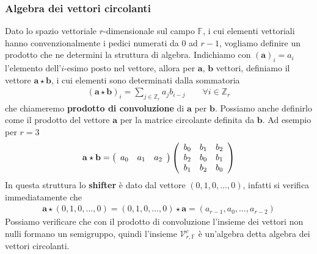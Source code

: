 
\subsubsection{Algebra dei vettori circolanti}

Dato lo spazio vettoriale $r$-dimensionale sul campo $\mathbb{F}$, i cui
elementi vettoriali hanno convenzionalmente i pedici numerati da $0$ ad $r-1$,
vogliamo definire un prodotto che ne determini la struttura di algebra. Indichiamo con $(\mathbf{a})_{i} = a_{i}$
l'elemento dell'$i$-esimo posto nel vettore, allora per $\mathbf{a}$, $\mathbf{b}$ vettori, definiamo il vettore $\mathbf{a} \star \mathbf{b}$, i cui
elementi sono determinati dalla sommatoria
\begin{align*}
(\mathbf{a} \star \mathbf{b})_{i} = \sum_{j \in \mathbb{Z}_{r} } a_{j} b_{i-j}
\qquad \forall i \in \mathbb{Z}_{r}
\end{align*}
che chiameremo {\bf prodotto di convoluzione} di $\mathbf{a}$ per $\mathbf{b}$.
Possiamo anche definirlo come il prodotto del vettore $\mathbf{a}$ per la matrice
circolante definita da $\mathbf{b}$. Ad esempio per $r = 3$
\begin{align*}
\mathbf{a} \star \mathbf{b} =
\left(
\begin{array} {c c c }
a_0 & a_1 & a_2
\end{array}
\right)
\left(
\begin{array} {c c c}
b_0 & b_1 & b_2   \\
b_2 & b_0 & b_1   \\
b_1 & b_2 & b_0
\end{array}
\right)
\end{align*}
In questa struttura lo {\bf shifter} è dato dal vettore $(0,1,0,\dots, 0)$,
infatti si verifica immediatamente che
\begin{align*}
\mathbf{a} \star (0,1,0,\dots, 0) =  (0,1,0,\dots, 0) \star \mathbf{a} =
(a_{r-1}, a_0,  \dots , a_{r-2} )
\end{align*}
Possiamo verificare che con il prodotto di convoluzione
l'insieme dei vettori non nulli formano un semigruppo, quindi
l'insieme $\mathcal{V}_{r,\mathbb{F} }^{c}$ è un'algebra
detta algebra dei vettori circolanti.

